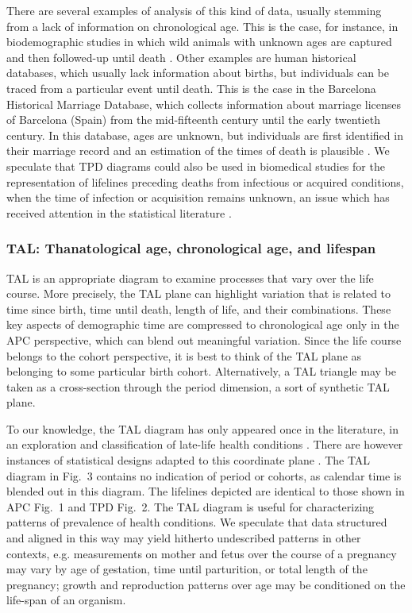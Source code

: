 \documentclass{bmcart}
\theoremstyle{definition}
\begin{document}
There are several examples of analysis of this kind of data, usually stemming
from a lack of information on chronological age. This is the case, for instance,
in biodemographic studies in which wild animals with unknown ages are captured
and then followed-up until death \citep{muller2004demographic,
muller2007survival}. Other examples are human historical databases, which
usually lack information about births, but individuals can be traced from a
particular event until death. This is the case in the Barcelona Historical
Marriage Database, which collects information about marriage licenses of
Barcelona (Spain) from the mid-fifteenth century until the early twentieth
century. In this database, ages are unknown, but individuals are first
identified in their marriage record and an estimation of the times of death is
plausible \citep{villavicencio2015reconstructing}. We speculate that TPD
diagrams could also be used in biomedical studies for the representation of
lifelines preceding deaths from infectious or acquired conditions, when the time
of infection or acquisition remains unknown, an issue which has received
attention in the statistical literature \citep[see e.g.][]{chan2010backward}.

\FloatBarrier
\subsubsection{TAL: Thanatological age, chronological age, and
lifespan}
\label{sec:tal}
\FloatBarrier  
TAL is an appropriate diagram to examine processes that vary over the
life course.
More precisely, the TAL plane can highlight variation that is related to time
since birth, time until death, length of life, and their combinations. These
key aspects of demographic time are compressed to chronological age only in the
APC perspective, which can blend out meaningful variation. Since the life course
belongs to the cohort perspective, it is best to think of the TAL plane as belonging to some particular birth cohort. Alternatively, a TAL triangle may be taken as a cross-section through the period dimension, a sort of synthetic TAL plane.

To our knowledge, the TAL diagram has only appeared once in the literature, in an exploration and classification of late-life health
conditions \citep{riffe2016ttd}. There are however instances of statistical
designs adapted to this coordinate plane \citep[see e.g.,][]{dempsey2016, Jewell2016}. The TAL diagram in Fig.~3 contains no indication of
period or cohorts, as calendar time is blended out in this diagram.
The lifelines depicted are identical to those shown in APC Fig.~1
and TPD Fig.~2. The TAL diagram is useful for characterizing patterns of prevalence of health conditions. We speculate
that data structured and aligned in this way may yield hitherto undescribed
patterns in other contexts, e.g. measurements on mother and fetus over the
course of a pregnancy may vary by age of gestation, time until parturition, or
total length of the pregnancy; growth and reproduction patterns over age may be conditioned on the life-span of an organism.
\end{document}
